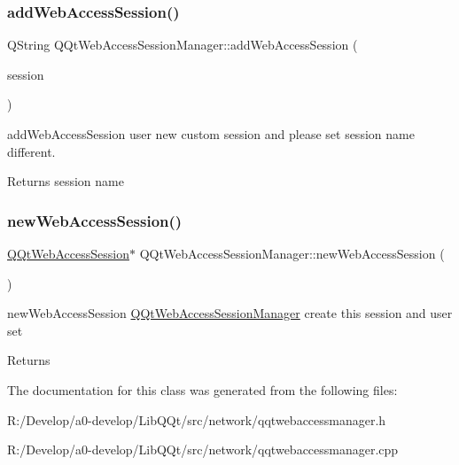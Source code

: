 \subsubsection{\texorpdfstring{add\+Web\+Access\+Session()}{addWebAccessSession()}}
{\footnotesize\ttfamily Q\+String Q\+Qt\+Web\+Access\+Session\+Manager\+::add\+Web\+Access\+Session (\begin{DoxyParamCaption}\item[{\mbox{\hyperlink{class_q_qt_web_access_session}{Q\+Qt\+Web\+Access\+Session}} $\ast$}]{session }\end{DoxyParamCaption})\hspace{0.3cm}{\ttfamily [inline]}}



add\+Web\+Access\+Session user new custom session and please set session name different. 

\begin{DoxyReturn}{Returns}
session name 
\end{DoxyReturn}
\mbox{\label{class_q_qt_web_access_session_manager_a01352e16e60301a51d88b5c408b33e37}} 
\subsubsection{\texorpdfstring{new\+Web\+Access\+Session()}{newWebAccessSession()}}
{\footnotesize\ttfamily \mbox{\hyperlink{class_q_qt_web_access_session}{Q\+Qt\+Web\+Access\+Session}}$\ast$ Q\+Qt\+Web\+Access\+Session\+Manager\+::new\+Web\+Access\+Session (\begin{DoxyParamCaption}{ }\end{DoxyParamCaption})\hspace{0.3cm}{\ttfamily [inline]}}



new\+Web\+Access\+Session \mbox{\hyperlink{class_q_qt_web_access_session_manager}{Q\+Qt\+Web\+Access\+Session\+Manager}} create this session and user set 

\begin{DoxyReturn}{Returns}

\end{DoxyReturn}


The documentation for this class was generated from the following files\+:\begin{DoxyCompactItemize}
\item 
R\+:/\+Develop/a0-\/develop/\+Lib\+Q\+Qt/src/network/qqtwebaccessmanager.\+h\item 
R\+:/\+Develop/a0-\/develop/\+Lib\+Q\+Qt/src/network/qqtwebaccessmanager.\+cpp\end{DoxyCompactItemize}

